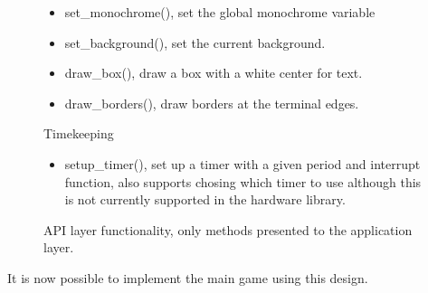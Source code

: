 \begin{figure}
\begin{minipage}[b]{\columnwidth}
\begin{minipage}[t]{0.5\linewidth}
\begin{itemize}
				\item set\_monochrome(), set the global monochrome variable
				\item set\_background(), set the current background.
				\item draw\_box(), draw a box with a white center for text.
				\item draw\_borders(), draw borders at the terminal edges.
			\end{itemize}
		\end{minipage}
		\begin{minipage}[t]{0.5\linewidth}
			Timekeeping
			\begin{itemize}
				\item setup\_timer(), set up a timer with a given period and interrupt function, 
						also supports chosing which timer to use although this is not currently supported
						in the hardware library.
			\end{itemize}
		\end{minipage}
	\end{minipage}
	\caption{API layer functionality, only methods presented to the application layer.}
	\label{api_modules}
\end{figure}

It is now possible to implement the main game using this design.
